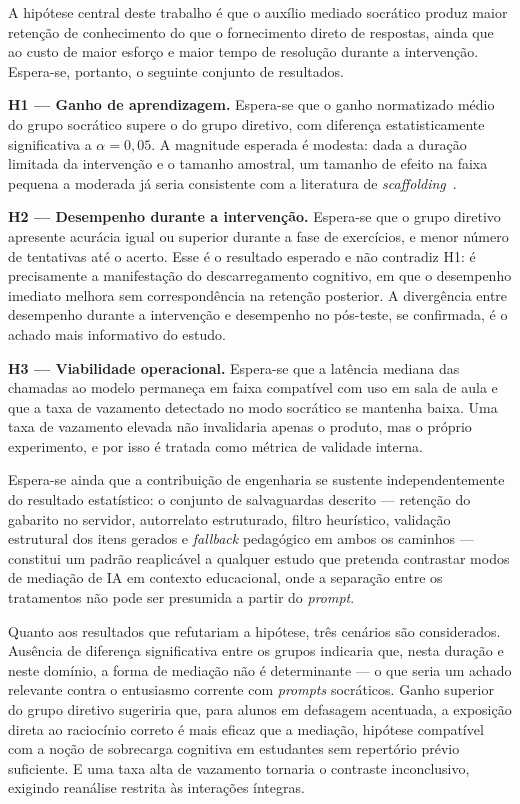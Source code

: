 \documentclass[10pt, a4paper, twocolumn]{article}
\begin{document}
A hipótese central deste trabalho é que o auxílio mediado socrático produz maior
retenção de conhecimento do que o fornecimento direto de respostas, ainda que ao
custo de maior esforço e maior tempo de resolução durante a intervenção. Espera-se,
portanto, o seguinte conjunto de resultados.

\textbf{H1 --- Ganho de aprendizagem.} Espera-se que o ganho normatizado médio do
grupo socrático supere o do grupo diretivo, com diferença estatisticamente
significativa a $\alpha = 0{,}05$. A magnitude esperada é modesta: dada a duração
limitada da intervenção e o tamanho amostral, um tamanho de efeito na faixa
pequena a moderada já seria consistente com a literatura de
\textit{scaffolding}~\cite{kestin2025,ocen2026}.

\textbf{H2 --- Desempenho durante a intervenção.} Espera-se que o grupo diretivo
apresente acurácia igual ou superior durante a fase de exercícios, e menor número
de tentativas até o acerto. Esse é o resultado esperado e não contradiz H1: é
precisamente a manifestação do descarregamento cognitivo, em que o desempenho
imediato melhora sem correspondência na retenção posterior. A divergência entre
desempenho durante a intervenção e desempenho no pós-teste, se confirmada, é o
achado mais informativo do estudo.

\textbf{H3 --- Viabilidade operacional.} Espera-se que a latência mediana das
chamadas ao modelo permaneça em faixa compatível com uso em sala de aula e que a
taxa de vazamento detectado no modo socrático se mantenha baixa. Uma taxa de
vazamento elevada não invalidaria apenas o produto, mas o próprio experimento, e
por isso é tratada como métrica de validade interna.

Espera-se ainda que a contribuição de engenharia se sustente
independentemente do resultado estatístico: o conjunto de salvaguardas descrito
--- retenção do gabarito no servidor, autorrelato estruturado, filtro heurístico,
validação estrutural dos itens gerados e \textit{fallback} pedagógico em ambos os
caminhos --- constitui um padrão reaplicável a qualquer
estudo que pretenda contrastar modos de mediação de IA em contexto educacional,
onde a separação entre os tratamentos não pode ser presumida a partir do
\textit{prompt}.

Quanto aos resultados que refutariam a hipótese, três cenários são
considerados. Ausência de diferença significativa entre os grupos indicaria que,
nesta duração e neste domínio, a forma de mediação não é determinante --- o que
seria um achado relevante contra o entusiasmo corrente com \textit{prompts}
socráticos. Ganho superior do grupo diretivo sugeriria que, para alunos em
defasagem acentuada, a exposição direta ao raciocínio correto é mais eficaz que a
mediação, hipótese compatível com a noção de sobrecarga cognitiva em estudantes
sem repertório prévio suficiente. E uma taxa alta de vazamento tornaria o
contraste inconclusivo, exigindo reanálise restrita às interações íntegras.
\end{document}
